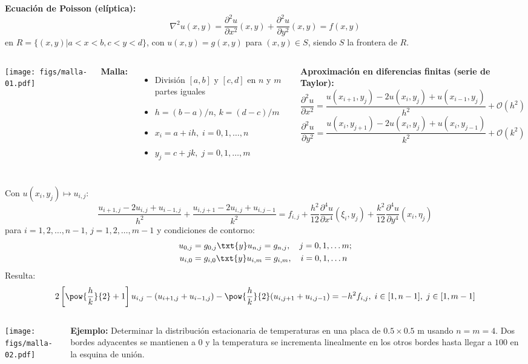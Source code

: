 \documentclass[9pt, aspectratio=169]{beamer}
\begin{document}
\begin{frame}
\textbf{Ecuación de Poisson (elíptica):}
\[ \nabla^2 u(x, y) = \frac{\partial^2 u}{\partial x^2}(x, y) + \frac{\partial^2 u}{\partial y^2}(x, y) = f(x, y) \]
en $R = \{(x, y) | a < x < b, c < y < d \}$, con $u(x, y) = g(x, y)$ para $(x, y) \in S$, siendo $S$ la frontera de $R$.
\begin{columns}
\cx
\begin{center}
    \texttt{[image: figs/malla-01.pdf]}
\end{center}
\cx
\textbf{Malla:}
\begin{itemize}
    \item División $[a, b]$ y $[c, d]$ en $n$ y $m$ partes iguales
    \item $h = (b - a) / n$, $k = (d - c) / m$
    \item $x_i = a + i h, \; i = 0, 1, \ldots, n$
    \item $y_j = c + j k, \; j = 0, 1, \ldots, m$
\end{itemize}

\textbf{Aproximación en diferencias finitas (serie de Taylor):}
\[ \frac{\partial^2 u}{\partial x^2} = \frac{u(x_{i+1}, y_j) - 2 u(x_i, y_j) + u(x_{i-1},y_j)}{h^2} + \mathcal{O}(h^2) \]
\[ \frac{\partial^2 u}{\partial y^2} = \frac{u(x_i, y_{j+1}) - 2 u(x_i, y_j) + u(x_i,y_{j-1})}{k^2} + \mathcal{O}(k^2) \]
\end{columns}
\end{frame}

\begin{frame}
    Con $u(x_i, y_j) \mapsto u_{i,j}$:
    \[ \frac{u_{i+1, j} - 2 u_{i,j} + u_{i-1, j}}{h^2} + \frac{u_{i, j+1} - 2 u_{i,j} + u_{i, j-1}}{k^2} = f_{i, j} + \frac{h^2}{12} \frac{\partial^4 u}{\partial x^4}(\xi_i, y_j) + \frac{k^2}{12} \frac{\partial^4 u}{\partial y^4}(x_i, \eta_j) \]
    para $i = 1, 2, \ldots, n-1$, $j = 1, 2, \ldots, m-1$ y condiciones de contorno:
\begin{align*}
    u_{0, j} &= g_{0, j} \txt{y} u_{n, j} = g_{n, j}, \quad j = 0, 1, \ldots m; \\
    u_{i, 0} &= g_{i, 0} \txt{y} u_{i, m} = g_{i, m}, \quad i = 0, 1, \ldots n
\end{align*}
Resulta:
\[ 2 \left[ \pow{\frac{h}{k}}{2} + 1 \right]  u_{i,j} - (u_{i+1, j} + u_{i-1,j}) - \pow{\frac{h}{k}}{2} (u_{i, j+1} + u_{i, j-1}) = -h^2 f_{i,j}, \; i \in [1, n-1], \; j \in [1, m-1] \]
\begin{columns}
\cx
    \begin{center}
        \texttt{[image: figs/malla-02.pdf]}
    \end{center}
\cx
\vspace{1em} \pause

\textbf{Ejemplo:} Determinar la distribución estacionaria de temperaturas en una placa de $0.5 \times 0.5$ m usando $n = m = 4$. Dos bordes adyacentes se mantienen a $0$ \textcelsius{} y la temperatura se incrementa linealmente en los otros bordes hasta llegar a $100$ \textcelsius{} en la esquina de unión.
\end{columns}
\end{frame}
\end{document}
